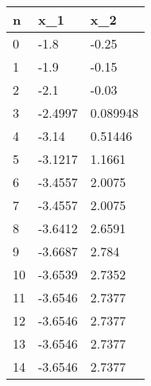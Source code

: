 \begin{tabular}{lll}
n & x_{1} & x_{2} \\ 
\hline 
0 & -1.8 & -0.25 \\ 
1 & -1.9 & -0.15 \\ 
2 & -2.1 & -0.03 \\ 
3 & -2.4997 & 0.089948 \\ 
4 & -3.14 & 0.51446 \\ 
5 & -3.1217 & 1.1661 \\ 
6 & -3.4557 & 2.0075 \\ 
7 & -3.4557 & 2.0075 \\ 
8 & -3.6412 & 2.6591 \\ 
9 & -3.6687 & 2.784 \\ 
10 & -3.6539 & 2.7352 \\ 
11 & -3.6546 & 2.7377 \\ 
12 & -3.6546 & 2.7377 \\ 
13 & -3.6546 & 2.7377 \\ 
14 & -3.6546 & 2.7377 \\ 
\hline 
\end{tabular}